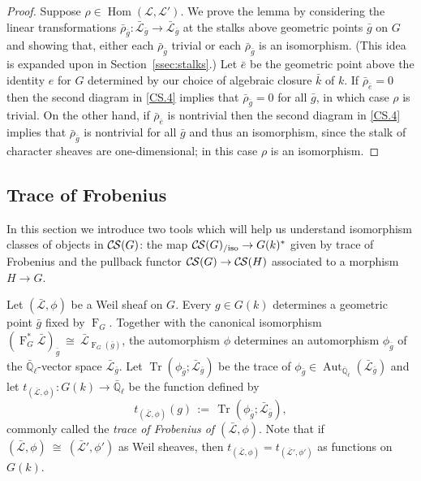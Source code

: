 \documentclass[10pt]{amsart}
\theoremstyle{plain}
\theoremstyle{definition}
\theoremstyle{remark}
\newcommand{\EE}{\mathbb{\bar Q}_\ell}
\newcommand{\bFq}{\bar{k}}
\newcommand{\Fq}{k}
\newcommand{\Frob}[1]{\operatorname{F}_{#1}}
\DeclareMathOperator{\Aut}{Aut}
\DeclareMathOperator{\Hom}{Hom}
\DeclareMathOperator{\trace}{Tr}
\newcommand{\ceq}{{\, :=\, }}
\newcommand{\iso}{{\ \cong\ }}
\newcommand{\trFrob}[1]{t_{#1}}
\newcommand{\cs}[1]{{\mathcal{#1}}}
\newcommand{\gcs}[1]{{\mathcal{\bar #1}}}
\newcommand{\CS}{{\mathcal{C\hskip-0.8pt S}}}
\newcommand{\CSiso}[1]{\CS(#1)_{/\text{iso}}}
\newcommand{\bg}{\bar{g}}
\newcommand{\brho}{{\bar\rho}}
\begin{document}
\begin{proof}
Suppose $\rho \in \Hom(\cs{L},\cs{L}')$.
We prove the lemma by considering the linear transformations $\brho_{\bar g} : \gcs{L}_{\bar g} \to \gcs{L}_{\bar g}$ at the stalks above geometric points ${\bar g}$ on $G$ and showing that, either each $\brho_{\bar g}$ trivial or each $\brho_{\bar g}$ is an isomorphism.
(This idea is expanded upon in Section~\ref{ssec:stalks}.)
Let ${\bar e}$ be the geometric point above the identity $e$ for $G$ determined by our choice of algebraic closure $\bFq$ of $\Fq$.
If $\brho_{\bar e} = 0$ then the second diagram in \ref{CS.4} implies that $\brho_{\bar g} = 0$ for all ${\bar g}$, in which case $\rho$ is trivial.
On the other hand, if $\brho_{\bar e}$ is nontrivial then the second diagram in \ref{CS.4}  implies that $\brho_{\bar g}$ is nontrivial for all ${\bar g}$ and thus an isomorphism, since the stalk of character sheaves are one-dimensional; in this case $\rho$ is an isomorphism.
\end{proof}


\subsection{Trace of Frobenius}\label{ssec:Frob}

In this section we introduce two tools which will help us understand isomorphism classes of objects in $\CS(G)$: the map $\CSiso{G} \to G(k)^*$ given by trace of Frobenius and the pullback functor $\CS(G) \to \CS(H)$ associated to a morphism $H \to G$.

Let $(\gcs{L},\phi)$ be a Weil sheaf on $G$. Every $g\in G(\Fq)$
determines a geometric point $\bg$ fixed by $\Frob{G}$. 
Together with the canonical isomorphism $(\Frob{G}^*\gcs{L})_{\bg} \iso  \gcs{L}_{\Frob{G}(\bg)}$, the automorphism $\phi$ determines an automorphism $\phi_{\bg}$ of the $\EE$-vector space $\gcs{L}_{\bg}$.
Let $\trace(\phi_{\bg};\gcs{L}_{\bg})$ be the trace of $\phi_{\bg} \in \Aut_{\EE}(\gcs{L}_{\bg})$ and let $\trFrob{(\gcs{L},\phi)} : G(\Fq)\to \EE$ be the function defined by 
\begin{equation}\label{trWeil}
\trFrob{(\gcs{L},\phi)}(g) \ceq \trace(\phi_{\bg};\gcs{L}_{\bg}),
\end{equation}
commonly called the {\em trace of Frobenius of $(\gcs{L},\phi)$}.
Note that if $(\gcs{L},\phi) \iso (\gcs{L'},\phi')$ as Weil sheaves, 
then $\trFrob{(\gcs{L},\phi)} = \trFrob{(\gcs{L'},\phi')}$ as functions on $G(\Fq)$.
\end{document}
